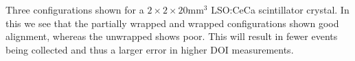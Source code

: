 \label{fig:confinement-20} Three configurations shown for a $2\times2\times20$mm$^3$ LSO:CeCa scintillator crystal. In this we see that the partially wrapped and wrapped configurations shown good alignment, whereas the unwrapped shows poor. This will result in fewer events being collected and thus a larger error in higher DOI measurements.